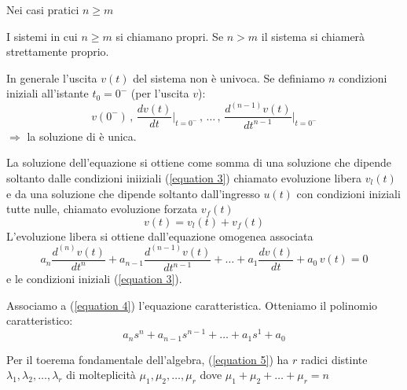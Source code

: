 \begin{osservazione}
	Nei casi pratici $n \ge m$	
\end{osservazione}

\begin{definizione}
	I sistemi in cui $n \ge m$ si chiamano propri. Se $n > m$ il sistema si chiamerà strettamente proprio.
\end{definizione}

\begin{osservazione}
	In generale l'uscita $v(t)$ del sistema %
	non è univoca. Se definiamo $n$ condizioni iniziali all'istante $t_0 = 0^-$ (per l'uscita $v$):
	\begin{equation}
		v(0^-) \,
		,\, \frac{dv(t)}{dt}\bigg\vert_{t=0^-} \,
		,\, \dots\,
		,\, \frac{d^{(n-1)}v(t)}{dt^{n-1}}\bigg\vert_{t=0^-}
		\tag{3}\label{equation 3}
	\end{equation}
	$\Rightarrow$ la soluzione di %
	è unica.
\end{osservazione}

La soluzione dell'equazione %
si ottiene come somma di una soluzione che dipende soltanto dalle condizioni iniiziali (\ref{equation 3}) chiamato evoluzione libera $v_l(t)$ e da una soluzione che dipende soltanto dall'ingresso $u(t)$ con condizioni iniziali tutte nulle, chiamato evoluzione forzata $v_f(t)$ %
\[
v(t) = v_l(t) + v_f(t)
\]
L'evoluzione libera si ottiene dall'equazione omogenea associata
\begin{equation}
	a_n \frac{d^{(n)} v(t)}{dt^n} 
		+ a_{n-1} \frac{d^{(n-1)} v(t)}{dt^{n-1}} 
		+ \dots 
		+ a_1 \frac{dv(t)}{dt} 
		+ a_0\,v(t)
	= 0
	\tag{4}\label{equation 4}
\end{equation}
e le condizioni iniziali (\ref{equation 3}).

Associamo a (\ref{equation 4}) l'equazione caratteristica. Otteniamo il polinomio caratteristico: %
\begin{equation}
	a_n s^n 
	+ a_{n-1} s^{n-1}
	+ \dots
	+ a_1 s^1
	+ a_0
	\tag{5}\label{equation 5}
\end{equation}

Per il toerema fondamentale dell'algebra, (\ref{equation 5}) ha $r$ radici  distinte $\lambda_1,\lambda_2, \dots, \lambda_r$ di molteplicità $\mu_1, \mu_2, \dots,\mu_r$ dove  $\mu_1 +\mu_2 + \dots + \mu_r = n$

